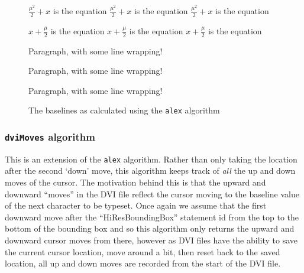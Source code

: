 \documentclass[]{article}
\begin{document}
\begin{figure}
\begin{center}
\vspace{0.3cm}
\settodepth{\dvidepth} {$\frac{\mu^2}{2} + x$ is the equation}%
\settowidth{\dviwidth} {$\frac{\mu^2}{2} + x$ is the equation}%
\raisebox{\dimexpr -\dvidepth+518356sp}{\makebox[0in][l]{\rule{\dviwidth}{.1pt}}}%
$\frac{\mu^2}{2} + x$ is the equation

\vspace{0.3cm}
\settodepth{\dvidepth} {$x + \frac{\mu}{2}$ is the equation}%
\settowidth{\dviwidth} {$x + \frac{\mu}{2}$ is the equation}%
\raisebox{\dimexpr -\dvidepth+225995sp}{\makebox[0in][l]{\rule{\dviwidth}{.1pt}}}%
$x + \frac{\mu}{2}$ is the equation

\vspace{0.3cm}
\settodepth{\dvidepth} {\begin{minipage}{1in}Paragraph, with some line wrapping!\end{minipage}}%
\settowidth{\dviwidth} {\begin{minipage}{1in}Paragraph, with some line wrapping!\end{minipage}}%
\raisebox{\dimexpr -\dvidepth+1700295sp}{\makebox[0in][l]{\rule{\dviwidth}{.1pt}}}%
\begin{minipage}{1in}Paragraph, with some line wrapping!\end{minipage}

\vspace{0.3cm}
\end{center}
\caption{The baselines as calculated using the \texttt{alex} algorithm}
\end{figure}

\subsubsection{\texorpdfstring{\texttt{dviMoves}
algorithm}{dviMoves algorithm}}\label{dvimoves-algorithm}

This is an extension of the \texttt{alex} algorithm. Rather than only
taking the location after the second `down' move, this algorithm keeps
track of \emph{all} the up and down moves of the cursor. The motivation
behind this is that the upward and downward ``moves'' in the DVI file
reflect the cursor moving to the baseline value of the next character to
be typeset. Once again we assume that the first downward move after the
``HiResBoundingBox'' statement id from the top to the bottom of the
bounding box and so this algorithm only returns the upward and downward
cursor moves from there, however as DVI files have the ability to save
the current cursor location, move around a bit, then reset back to the
saved location, all up and down moves are recorded from the start of the
DVI file.
\end{document}
